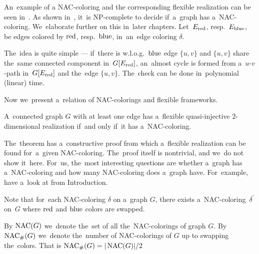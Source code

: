 An~example of a NAC-coloring and the corresponding flexible realization
can be seen in~.
%
As shown in~\cite{np_complete}, it~is NP-complete to decide if~a~graph has a~NAC-coloring.
We~elaborate further on this in~later chapters.
Let~\( E_{\text{red}}\), resp.\ \( E_{\text{blue}} \), be edges colored by \( \text{red} \), resp.~\( \text{blue} \),
in~an~edge coloring \( \delta \).
%
%
The~idea is quite simple --- if~there is w.l.o.g.\ \( \text{blue} \) edge \( \{u, v\} \)
and \( \{u, v\} \) share the~same connected component in~\( G[E_{\text{red}}] \),
an~almost cycle is formed from a~\( u \)-\( v \)-path in~\( G[E_{\text{red}}] \)
and the~edge \( \{u, v\} \).
The~check can be done in~polynomial (linear) time.

Now we~present a~relation of NAC-colorings and flexible frameworks.
%
\begin{theorem}
	A~connected graph \( G \) with at least one edge has a~flexible
	quasi-injective \( 2 \)-dimensional realization if~and only if~it has a~NAC-coloring.
\end{theorem}
%
The~theorem has a~constructive proof from which a~flexible realization
can be found for~a~given NAC-coloring.
The~proof itself is nontrivial, and we~do not show it~here.
For~us, the~most interesting questions are whether a~graph has a~NAC-coloring
and how many NAC-coloring does a~graph have.
For~example, have a~look at 
from Introduction.

Note that for~each NAC-coloring \( \delta \) on a~graph \( G \),
there exists a~NAC-coloring~\( \delta^\prime \) on~\( G \)
where \( \text{red} \) and \( \text{blue} \) colors are swapped.
%
\begin{definition}
	By \( \operatorname{NAC}(G) \) we~denote the~set of all the~NAC-colorings of graph \( G \).
	By \( \operatorname{NAC}_{\#} (G) \) we~denote the~number of NAC-colorings of \( G \)
	up to swapping the~colors.
	That is \( \operatorname{NAC}_{\#} (G) = | \operatorname{NAC}(G) | / 2 \)
\end{definition}
%

